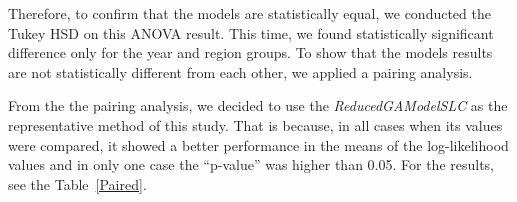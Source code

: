 Therefore, to confirm that the models are statistically equal, we conducted the Tukey HSD on this ANOVA result. This time, we found statistically significant difference only for the year and region groups. To show that the models results are not statistically different from each other, we applied a pairing analysis.

From the the pairing analysis, we decided to use the \textit{ReducedGAModelSLC} as the representative method of this study. That is because, in all cases when its values were compared, it showed a better performance in the means of the log-likelihood values and in only one case the ``p-value'' was higher than 0.05. For the results, see the Table~\ref{Paired}.



